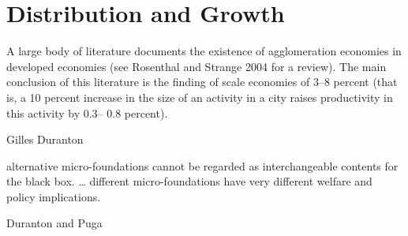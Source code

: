 \chapter{Distribution and Growth} \label{chapter-distribution}

\epigraph{A large body of literature documents the existence of agglomeration economies in developed economies (see Rosenthal and Strange 2004 for a review). The main conclusion of this literature is the finding of scale economies of 3–8 percent (that is, a 10 percent increase in the size of an activity in a city raises productivity in this activity by 0.3– 0.8 percent).}{Gilles Duranton \cite{durantonAreCitiesEngines2009}} 

\epigraph{alternative micro-foundations cannot be regarded as interchangeable contents for the black box. \dots%
different micro-foundations have very different welfare and policy implications. %
}{Duranton and Puga\cite{durantonMicroFoundationsUrbanAgglomeration2004}}




